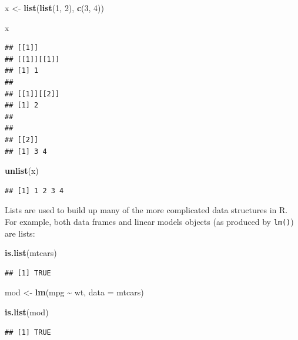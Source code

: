 \documentclass[
]{book}
\newenvironment{Shaded}{\begin{snugshade}}{\end{snugshade}}
\newcommand{\AttributeTok}[1]{\textcolor[rgb]{0.13,0.29,0.53}{#1}}
\newcommand{\DecValTok}[1]{\textcolor[rgb]{0.00,0.00,0.81}{#1}}
\newcommand{\FunctionTok}[1]{\textcolor[rgb]{0.13,0.29,0.53}{\textbf{#1}}}
\newcommand{\NormalTok}[1]{#1}
\newcommand{\OtherTok}[1]{\textcolor[rgb]{0.56,0.35,0.01}{#1}}
\newcommand{\SpecialCharTok}[1]{\textcolor[rgb]{0.81,0.36,0.00}{\textbf{#1}}}
\begin{document}
\begin{Shaded}
\begin{Highlighting}[]
\NormalTok{x }\OtherTok{\textless{}{-}} \FunctionTok{list}\NormalTok{(}\FunctionTok{list}\NormalTok{(}\DecValTok{1}\NormalTok{, }\DecValTok{2}\NormalTok{), }\FunctionTok{c}\NormalTok{(}\DecValTok{3}\NormalTok{, }\DecValTok{4}\NormalTok{))}

\NormalTok{x}
\end{Highlighting}
\end{Shaded}

\begin{verbatim}
## [[1]]
## [[1]][[1]]
## [1] 1
## 
## [[1]][[2]]
## [1] 2
## 
## 
## [[2]]
## [1] 3 4
\end{verbatim}

\begin{Shaded}
\begin{Highlighting}[]
\FunctionTok{unlist}\NormalTok{(x)}
\end{Highlighting}
\end{Shaded}

\begin{verbatim}
## [1] 1 2 3 4
\end{verbatim}

Lists are used to build up many of the more complicated data structures in R. For example, both data frames and linear models objects (as produced by \texttt{lm()}) are lists:

\begin{Shaded}
\begin{Highlighting}[]
\FunctionTok{is.list}\NormalTok{(mtcars)}
\end{Highlighting}
\end{Shaded}

\begin{verbatim}
## [1] TRUE
\end{verbatim}

\begin{Shaded}
\begin{Highlighting}[]
\NormalTok{mod }\OtherTok{\textless{}{-}} \FunctionTok{lm}\NormalTok{(mpg }\SpecialCharTok{\textasciitilde{}}\NormalTok{ wt, }\AttributeTok{data =}\NormalTok{ mtcars)}

\FunctionTok{is.list}\NormalTok{(mod)}
\end{Highlighting}
\end{Shaded}

\begin{verbatim}
## [1] TRUE
\end{verbatim}
\end{document}
